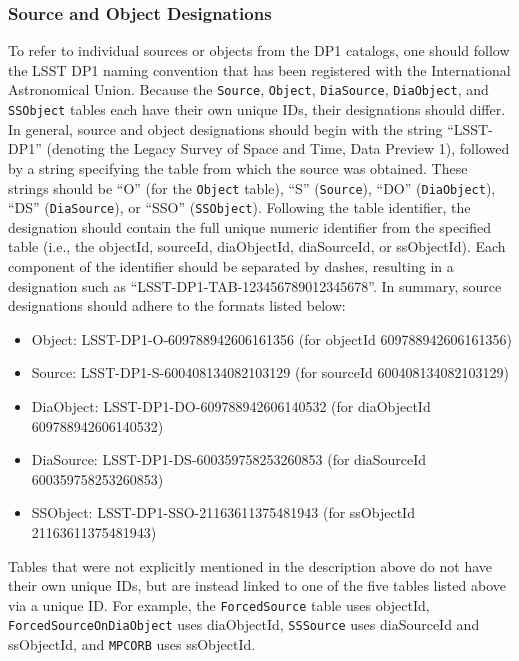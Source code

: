 \subsubsection{Source and Object Designations}\label{ssec:src_naming}
To refer to individual sources or objects from the \gls{DP1} catalogs, one should follow the LSST \gls{DP1} naming convention that has been registered with the International Astronomical Union.
Because the \texttt{Source}, \texttt{Object}, \texttt{DiaSource}, \texttt{DiaObject}, and \texttt{SSObject} tables each have their own unique IDs, their designations should differ.
In general, source and object designations should begin with the string ``LSST-\gls{DP1}'' (denoting the Legacy Survey of Space and Time, Data Preview 1), followed by a string specifying the table from which the source was obtained.
These strings should be ``O'' (for the \texttt{Object} table), ``S'' (\texttt{Source}), ``DO'' (\texttt{DiaObject}), ``DS'' (\texttt{DiaSource}), or ``SSO'' (\texttt{SSObject}).
Following the table identifier, the designation should contain the full unique numeric identifier from the specified table (i.e., the objectId, sourceId, diaObjectId, diaSourceId, or ssObjectId).
Each component of the identifier should be separated by dashes, resulting in a designation such as ``LSST-\gls{DP1}-TAB-123456789012345678''.
In summary, source designations should adhere to the formats listed below:

\begin{itemize}
\item Object: LSST-\gls{DP1}-O-609788942606161356 (for objectId 609788942606161356)
\item Source: LSST-\gls{DP1}-S-600408134082103129 (for sourceId 600408134082103129)
\item DiaObject: LSST-\gls{DP1}-DO-609788942606140532 (for diaObjectId 609788942606140532)
\item DiaSource: LSST-\gls{DP1}-DS-600359758253260853 (for diaSourceId 600359758253260853)
\item SSObject: LSST-\gls{DP1}-SSO-21163611375481943 (for ssObjectId 21163611375481943)
\end{itemize}

Tables that were not explicitly mentioned in the description above do not have their own unique IDs, but are instead linked to one of the five tables listed above via a unique ID.
For example, the \texttt{ForcedSource} table uses objectId, \texttt{ForcedSourceOnDiaObject} uses diaObjectId, \texttt{SSSource} uses diaSourceId and ssObjectId, and \texttt{MPCORB} uses ssObjectId.

